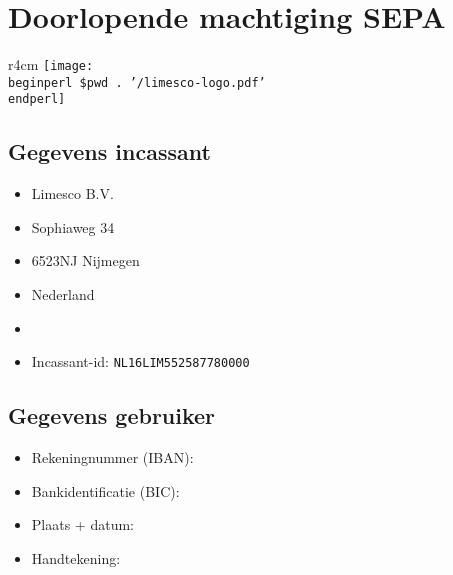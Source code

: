 \documentclass[a4paper,11pt]{memoir}
\begin{document}
\pagestyle{machtiging}

\section*{Doorlopende machtiging SEPA}

\begin{wrapfigure}[0]{r}{4cm}
\vspace{-0.5\linewidth}
\texttt{[image: \\beginperl \$pwd . '/limesco-logo.pdf' \\endperl]}
\vfill
\end{wrapfigure}

\subsection*{Gegevens incassant}
\begin{itemize}[leftmargin=0pt,label={},itemsep=-4pt]
\item Limesco B.V.
\item Sophiaweg 34
\item 6523NJ Nijmegen
\item Nederland
\item{}
\item Incassant-id: \texttt{NL16LIM552587780000}
\end{itemize}

\subsection*{Gegevens gebruiker}

\begin{itemize}[label={},leftmargin=0pt]
\item Rekeningnummer (IBAN): \dotfill
\item Bankidentificatie (BIC): \dotfill
\item Plaats + datum: \dotfill
\item Handtekening:
\end{itemize}
\end{document}
